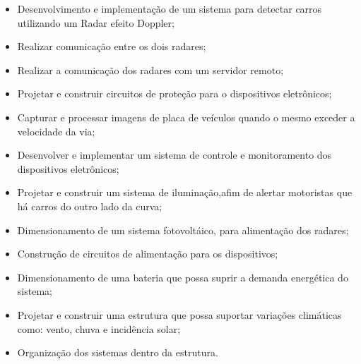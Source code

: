  \begin{itemize}
   \item Desenvolvimento e implementação de um sistema para detectar carros utilizando um Radar efeito Doppler;
   \item Realizar comunicação entre os dois radares;
   \item Realizar a comunicação dos radares com um servidor remoto;
   \item Projetar e construir circuitos de proteção para o dispositivos eletrônicos;
   \item Capturar e processar imagens de placa de veículos quando o mesmo exceder a velocidade da via;
   \item Desenvolver e implementar um sistema de controle e monitoramento dos dispositivos eletrônicos;
   \item Projetar e construir um sistema de iluminação,afim de alertar motoristas que há carros do outro lado da curva;
   \item Dimensionamento de um sistema fotovoltáico, para alimentação dos radares;
   \item Construção de circuitos de alimentação para os dispositivos;
   \item Dimensionamento de uma bateria que possa suprir a demanda energética do sistema;
   \item Projetar e construir uma estrutura que possa suportar variações climáticas como: vento, chuva e incidência solar;
   \item Organização dos sistemas dentro da estrutura. 
   
   
 \end{itemize}
